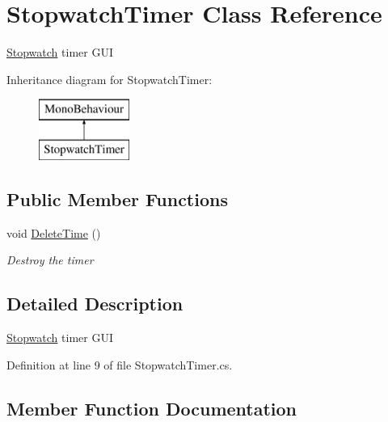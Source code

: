 \hypertarget{class_stopwatch_timer}{}\section{Stopwatch\+Timer Class Reference}
\label{class_stopwatch_timer}


\mbox{\hyperlink{class_stopwatch}{Stopwatch}} timer G\+UI  


Inheritance diagram for Stopwatch\+Timer\+:\begin{figure}[H]
\begin{center}
\leavevmode
\includegraphics[height=2.000000cm]{class_stopwatch_timer}
\end{center}
\end{figure}
\subsection*{Public Member Functions}
\begin{DoxyCompactItemize}
\item 
void \mbox{\hyperlink{class_stopwatch_timer_aa424018703bd9c176b51a7c90c0adcc0}{Delete\+Time}} ()
\begin{DoxyCompactList}\small\item\em Destroy the timer \end{DoxyCompactList}\end{DoxyCompactItemize}


\subsection{Detailed Description}
\mbox{\hyperlink{class_stopwatch}{Stopwatch}} timer G\+UI 



Definition at line 9 of file Stopwatch\+Timer.\+cs.



\subsection{Member Function Documentation}
\mbox{\label{class_stopwatch_timer_aa424018703bd9c176b51a7c90c0adcc0}} 
